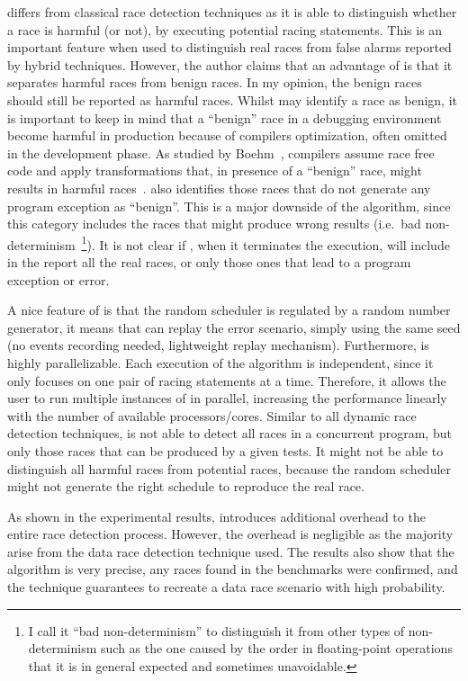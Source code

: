 \begin{refsection}
\rfuz differs from classical race detection techniques as it is able to
distinguish whether a race is harmful (or not), by executing potential racing
statements.
%
This is an important feature when used to distinguish real races from false
alarms reported by hybrid techniques.
%
However, the author claims that an advantage of \rfuz is that it separates
harmful races from benign races.
%
In my opinion, the benign races should still be reported as harmful races.
%
Whilst \rfuz may identify a race as benign, it is important to keep in mind
that a ``benign'' race in a debugging environment become harmful in production
because of compilers optimization, often omitted in the development phase.
%
As studied by Boehm~\cite{Boehm:2011:MPB:2001252.2001255}, compilers assume
race free code and apply transformations that, in presence of a ``benign''
race, might results in harmful races~\cite{ec2_2015-agralslpm}.
%
\rfuz also identifies those races that do not generate any program exception as
``benign''.
%
This is a major downside of the algorithm, since this category includes the
races that might produce wrong results (i.e.\ bad non-determinism~\footnote{I
  call it ``bad non-determinism'' to distinguish it from other types of
  non-determinism such as the one caused by the order in floating-point
  operations that it is in general expected and sometimes unavoidable.}).
%
It is not clear if \rfuz, when it terminates the execution, will include in
the report all the real races, or only those ones that lead to a program
exception or error.

A nice feature of \rfuz is that the random scheduler is regulated by a random
number generator, it means that \rfuz can replay the error scenario, simply
using the same seed (no events recording needed, lightweight replay
mechanism).
%
Furthermore, \rfuz is highly parallelizable.
%
Each execution of the algorithm is independent, since it only focuses on one
pair of racing statements at a time.
%
Therefore, it allows the user to run multiple instances of \rfuz in parallel,
increasing the performance linearly with the number of available
processors/cores.
%
Similar to all dynamic race detection techniques, \rfuz is not able to detect
all races in a concurrent program, but only those races that can be produced
by a given tests.
%
It might not be able to distinguish all harmful races from potential races,
because the random scheduler might not generate the right schedule to
reproduce the real race.

As shown in the experimental results, \rfuz introduces additional overhead to
the entire race detection process.
%
However, the overhead is negligible as the majority arise from the data race
detection technique used.
%
The results also show that the algorithm is very precise, any races found in
the benchmarks were confirmed, and the technique guarantees to recreate a data
race scenario with high probability.


\end{refsection}
